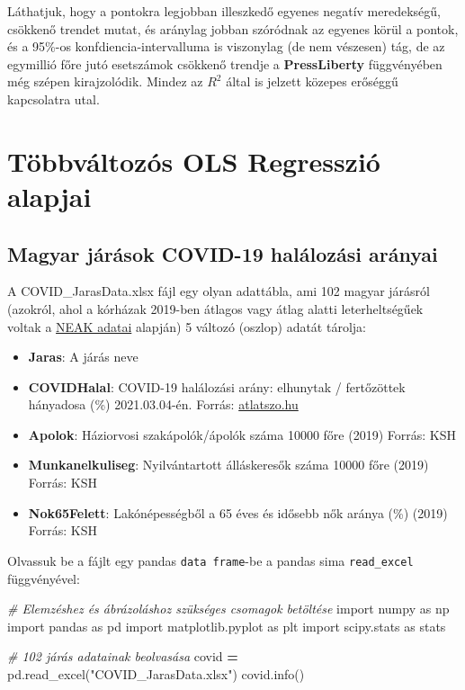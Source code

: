 \documentclass[
]{book}
\newenvironment{Shaded}{\begin{snugshade}}{\end{snugshade}}
\newcommand{\CommentTok}[1]{\textcolor[rgb]{0.56,0.35,0.01}{\textit{#1}}}
\newcommand{\ImportTok}[1]{#1}
\newcommand{\NormalTok}[1]{#1}
\newcommand{\OperatorTok}[1]{\textcolor[rgb]{0.81,0.36,0.00}{\textbf{#1}}}
\newcommand{\StringTok}[1]{\textcolor[rgb]{0.31,0.60,0.02}{#1}}
\providecommand{\tightlist}{%
  \setlength{\itemsep}{0pt}\setlength{\parskip}{0pt}}
\begin{document}
Láthatjuk, hogy a pontokra legjobban illeszkedő egyenes negatív meredekségű, csökkenő trendet mutat, és aránylag jobban szóródnak az egyenes körül a pontok, és a 95\%-os konfdiencia-intervalluma is viszonylag (de nem vészesen) tág, de az egymillió főre jutó esetszámok csökkenő trendje a \textbf{PressLiberty} függvényében még szépen kirajzolódik. Mindez az \(R^2\) által is jelzett közepes erőséggű kapcsolatra utal.

\chapter{Többváltozós OLS Regresszió alapjai}\label{tuxf6bbvuxe1ltozuxf3s-ols-regressziuxf3-alapjai}

\section{Magyar járások COVID-19 halálozási arányai}\label{magyar-juxe1ruxe1sok-covid-19-haluxe1lozuxe1si-aruxe1nyai}

A COVID\_JarasData.xlsx fájl egy olyan adattábla, ami 102 magyar járásról (azokról, ahol a kórházak 2019-ben átlagos vagy átlag alatti leterheltségűek voltak a \href{http://www.neak.gov.hu/data/cms1026624/Korhazi_agyszamkimutatas_2019.pdf}{NEAK adatai} alapján) 5 változó (oszlop) adatát tárolja:

\begin{itemize}
\tightlist
\item
  \textbf{Jaras}: A járás neve
\item
  \textbf{COVIDHalal}: COVID-19 halálozási arány: elhunytak / fertőzöttek hányadosa (\%) 2021.03.04-én. Forrás: \href{https://bit.ly/COVID-adatok}{atlatszo.hu}
\item
  \textbf{Apolok}: Háziorvosi szakápolók/ápolók száma 10000 főre (2019) Forrás: KSH
\item
  \textbf{Munkanelkuliseg}: Nyilvántartott álláskeresők száma 10000 főre (2019) Forrás: KSH
\item
  \textbf{Nok65Felett}: Lakónépességből a 65 éves és idősebb nők aránya (\%) (2019) Forrás: KSH
\end{itemize}

Olvassuk be a fájlt egy pandas \texttt{data\ frame}-be a pandas sima \texttt{read\_excel} függvényével:

\begin{Shaded}
\begin{Highlighting}[]
\CommentTok{\# Elemzéshez és ábrázoláshoz szükséges csomagok betöltése}
\ImportTok{import}\NormalTok{ numpy }\ImportTok{as}\NormalTok{ np}
\ImportTok{import}\NormalTok{ pandas }\ImportTok{as}\NormalTok{ pd}
\ImportTok{import}\NormalTok{ matplotlib.pyplot }\ImportTok{as}\NormalTok{ plt}
\ImportTok{import}\NormalTok{ scipy.stats }\ImportTok{as}\NormalTok{ stats}

\CommentTok{\# 102 járás adatainak beolvasása}
\NormalTok{covid }\OperatorTok{=}\NormalTok{ pd.read\_excel(}\StringTok{"COVID\_JarasData.xlsx"}\NormalTok{)}
\NormalTok{covid.info()}
\end{Highlighting}
\end{Shaded}
\end{document}
